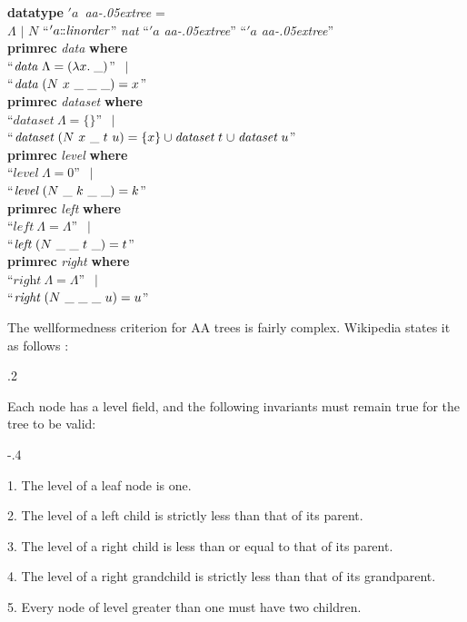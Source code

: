 \documentclass[a4paper,12pt]{article}
\def\Colon{\mathord{:\mkern-1.5mu:}}
\def\unk{{\_}}
\def\unkef{(\lambda x.\; \unk)}
\renewcommand\_{\hbox{\textunderscore\kern-.05ex}}
\begin{document}
\prew
\textbf{datatype} $'a$~\textit{aa\_tree} = \\
\hbox{}\quad $\Lambda$ $\mid$ $N$ ``\kern1pt$'a\Colon \textit{linorder\/}$'' \textit{nat} ``\kern1pt$'a$ \textit{aa\_tree}'' ``\kern1pt$'a$ \textit{aa\_tree}''  \\[2\smallskipamount]
\textbf{primrec} \textit{data} \textbf{where} \\
``$\textit{data}~\Lambda = \unkef$'' $\,\mid$ \\
``$\textit{data}~(N~x~\_~\_~\_) = x$'' \\[2\smallskipamount]
\textbf{primrec} \textit{dataset} \textbf{where} \\
``$\textit{dataset}~\Lambda = \{\}$'' $\,\mid$ \\
``$\textit{dataset}~(N~x~\_~t~u) = \{x\} \cup \textit{dataset}~t \mathrel{\cup} \textit{dataset}~u$'' \\[2\smallskipamount]
\textbf{primrec} \textit{level} \textbf{where} \\
``$\textit{level}~\Lambda = 0$'' $\,\mid$ \\
``$\textit{level}~(N~\_~k~\_~\_) = k$'' \\[2\smallskipamount]
\textbf{primrec} \textit{left} \textbf{where} \\
``$\textit{left}~\Lambda = \Lambda$'' $\,\mid$ \\
``$\textit{left}~(N~\_~\_~t~\_) = t$'' \\[2\smallskipamount]
\textbf{primrec} \textit{right} \textbf{where} \\
``$\textit{right}~\Lambda = \Lambda$'' $\,\mid$ \\
``$\textit{right}~(N~\_~\_~\_~u) = u$''
\postw

The wellformedness criterion for AA trees is fairly complex. Wikipedia states it
as follows \cite{wikipedia-2009-aa-trees}:

\kern.2\parskip %

\pre
Each node has a level field, and the following invariants must remain true for
the tree to be valid:

\raggedright

\kern-.4\parskip %

\begin{enum}
\item[]
\begin{enum}
\item[1.] The level of a leaf node is one.
\item[2.] The level of a left child is strictly less than that of its parent.
\item[3.] The level of a right child is less than or equal to that of its parent.
\item[4.] The level of a right grandchild is strictly less than that of its grandparent.
\item[5.] Every node of level greater than one must have two children.
\end{enum}
\end{enum}
\post
\end{document}
